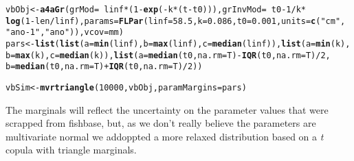 \documentclass[a4paper,english,10pt]{article}\usepackage[]{graphicx}\usepackage[]{color}
\makeatletter
\newcommand{\hlnum}[1]{\textcolor[rgb]{0.686,0.059,0.569}{#1}}%
\newcommand{\hlstr}[1]{\textcolor[rgb]{0.192,0.494,0.8}{#1}}%
\newcommand{\hlopt}[1]{\textcolor[rgb]{0,0,0}{#1}}%
\newcommand{\hlstd}[1]{\textcolor[rgb]{0.345,0.345,0.345}{#1}}%
\newcommand{\hlkwb}[1]{\textcolor[rgb]{0.69,0.353,0.396}{#1}}%
\newcommand{\hlkwc}[1]{\textcolor[rgb]{0.333,0.667,0.333}{#1}}%
\newcommand{\hlkwd}[1]{\textcolor[rgb]{0.737,0.353,0.396}{\textbf{#1}}}%
\newenvironment{kframe}{%
 \def\at@end@of@kframe{}%
 \ifinner\ifhmode%
  \def\at@end@of@kframe{\end{minipage}}%
  \begin{minipage}{\columnwidth}%
 \fi\fi%
 \def\FrameCommand##1{\hskip\@totalleftmargin \hskip-\fboxsep
 \colorbox{shadecolor}{##1}\hskip-\fboxsep
     \hskip-\linewidth \hskip-\@totalleftmargin \hskip\columnwidth}%
 \MakeFramed {\advance\hsize-\width
   \@totalleftmargin\z@ \linewidth\hsize
   \@setminipage}}%
 {\par\unskip\endMakeFramed%
 \at@end@of@kframe}
\newenvironment{knitrout}{}{} %
\makeatother
\begin{document}
\begin{knitrout}
\begin{kframe}
{\ttfamily\noindent\bfseries\color{errorcolor}{\#\# Error: \$ operator is invalid for atomic vectors}}\begin{alltt}
\hlstd{vbObj} \hlkwb{<-} \hlkwd{a4aGr}\hlstd{(}\hlkwc{grMod} \hlstd{=} \hlopt{~}\hlstd{linf} \hlopt{*} \hlstd{(}\hlnum{1} \hlopt{-} \hlkwd{exp}\hlstd{(}\hlopt{-}\hlstd{k} \hlopt{*} \hlstd{(t} \hlopt{-} \hlstd{t0))),} \hlkwc{grInvMod} \hlstd{=} \hlopt{~}\hlstd{t0} \hlopt{-} \hlnum{1}\hlopt{/}\hlstd{k} \hlopt{*}
    \hlkwd{log}\hlstd{(}\hlnum{1} \hlopt{-} \hlstd{len}\hlopt{/}\hlstd{linf),} \hlkwc{params} \hlstd{=} \hlkwd{FLPar}\hlstd{(}\hlkwc{linf} \hlstd{=} \hlnum{58.5}\hlstd{,} \hlkwc{k} \hlstd{=} \hlnum{0.086}\hlstd{,} \hlkwc{t0} \hlstd{=} \hlnum{0.001}\hlstd{,} \hlkwc{units} \hlstd{=} \hlkwd{c}\hlstd{(}\hlstr{"cm"}\hlstd{,}
    \hlstr{"ano-1"}\hlstd{,} \hlstr{"ano"}\hlstd{)),} \hlkwc{vcov} \hlstd{= mm)}
\hlstd{pars} \hlkwb{<-} \hlkwd{list}\hlstd{(}\hlkwd{list}\hlstd{(}\hlkwc{a} \hlstd{=} \hlkwd{min}\hlstd{(linf),} \hlkwc{b} \hlstd{=} \hlkwd{max}\hlstd{(linf),} \hlkwc{c} \hlstd{=} \hlkwd{median}\hlstd{(linf)),} \hlkwd{list}\hlstd{(}\hlkwc{a} \hlstd{=} \hlkwd{min}\hlstd{(k),}
    \hlkwc{b} \hlstd{=} \hlkwd{max}\hlstd{(k),} \hlkwc{c} \hlstd{=} \hlkwd{median}\hlstd{(k)),} \hlkwd{list}\hlstd{(}\hlkwc{a} \hlstd{=} \hlkwd{median}\hlstd{(t0,} \hlkwc{na.rm} \hlstd{= T)} \hlopt{-} \hlkwd{IQR}\hlstd{(t0,} \hlkwc{na.rm} \hlstd{= T)}\hlopt{/}\hlnum{2}\hlstd{,}
    \hlkwc{b} \hlstd{=} \hlkwd{median}\hlstd{(t0,} \hlkwc{na.rm} \hlstd{= T)} \hlopt{+} \hlkwd{IQR}\hlstd{(t0,} \hlkwc{na.rm} \hlstd{= T)}\hlopt{/}\hlnum{2}\hlstd{))}
\end{alltt}


{\ttfamily\noindent\bfseries\color{errorcolor}{\#\# Error: object 'linf' not found}}\begin{alltt}
\hlstd{vbSim} \hlkwb{<-} \hlkwd{mvrtriangle}\hlstd{(}\hlnum{10000}\hlstd{, vbObj,} \hlkwc{paramMargins} \hlstd{= pars)}
\end{alltt}


{\ttfamily\noindent\bfseries\color{errorcolor}{\#\# Error: object of type 'closure' is not subsettable}}\end{kframe}
\end{knitrout}


The marginals will reflect the uncertainty on the parameter values that were scrapped from fishbase, but, as we don't really believe the parameters are multivariate normal we addoppted a more relaxed distribution based on a \emph{t} copula with triangle marginals.
\end{document}
